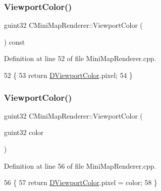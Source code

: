 \subsubsection{\texorpdfstring{Viewport\+Color()}{ViewportColor()}\hspace{0.1cm}{\footnotesize\ttfamily [1/2]}}
{\footnotesize\ttfamily guint32 C\+Mini\+Map\+Renderer\+::\+Viewport\+Color (\begin{DoxyParamCaption}{ }\end{DoxyParamCaption}) const}



Definition at line 52 of file Mini\+Map\+Renderer.\+cpp.


\begin{DoxyCode}
52                                              \{
53     \textcolor{keywordflow}{return} \hyperlink{classCMiniMapRenderer_a6a4f56052a4ced356448f5f1cc9a465e}{DViewportColor}.pixel;
54 \}
\end{DoxyCode}
\hypertarget{classCMiniMapRenderer_a89bf3db7ca4273dfcadff53da12824fc}{}\label{classCMiniMapRenderer_a89bf3db7ca4273dfcadff53da12824fc} 
\subsubsection{\texorpdfstring{Viewport\+Color()}{ViewportColor()}\hspace{0.1cm}{\footnotesize\ttfamily [2/2]}}
{\footnotesize\ttfamily guint32 C\+Mini\+Map\+Renderer\+::\+Viewport\+Color (\begin{DoxyParamCaption}\item[{guint32}]{color }\end{DoxyParamCaption})}



Definition at line 56 of file Mini\+Map\+Renderer.\+cpp.


\begin{DoxyCode}
56                                                     \{
57     \textcolor{keywordflow}{return} \hyperlink{classCMiniMapRenderer_a6a4f56052a4ced356448f5f1cc9a465e}{DViewportColor}.pixel = color;
58 \}
\end{DoxyCode}
\hypertarget{classCMiniMapRenderer_a2681c028e9f9ad916881a06846cd7110}{}\label{classCMiniMapRenderer_a2681c028e9f9ad916881a06846cd7110} 

